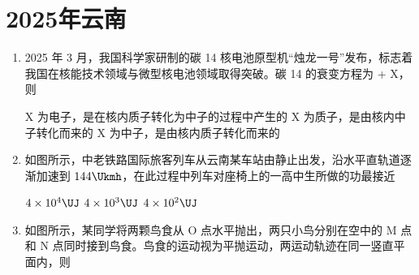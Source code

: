 \documentclass[\gkver]{gaokaozhenti}
\begin{document}
\chapter{2025年云南}

\begin{enumerate}
\item
2025 年 3 月，我国科学家研制的碳 14 核电池原型机“烛龙一号”发布，标志着我国在核能技术领域与微型核电池领域取得突破。碳 14 的衰变方程为  + X，则

{X 为电子，是在核内质子转化为中子的过程中产生的}
{X 为质子，是由核内中子转化而来的}
{X 为中子，是由核内质子转化而来的}


\item
如图所示，中老铁路国际旅客列车从云南某车站由静止出发，沿水平直轨道逐渐加速到 $144 \Ukmh$，在此过程中列车对座椅上的一高中生所做的功最接近


{$4 \times 10^{4} \UJ$}
{$4 \times 10^{3} \UJ$}
{$4 \times 10^{2} \UJ$}


\item
如图所示，某同学将两颗鸟食从 O 点水平抛出，两只小鸟分别在空中的 M 点和 N 点同时接到鸟食。鸟食的运动视为平抛运动，两运动轨迹在同一竖直平面内，则


\end{enumerate}
\end{document}
